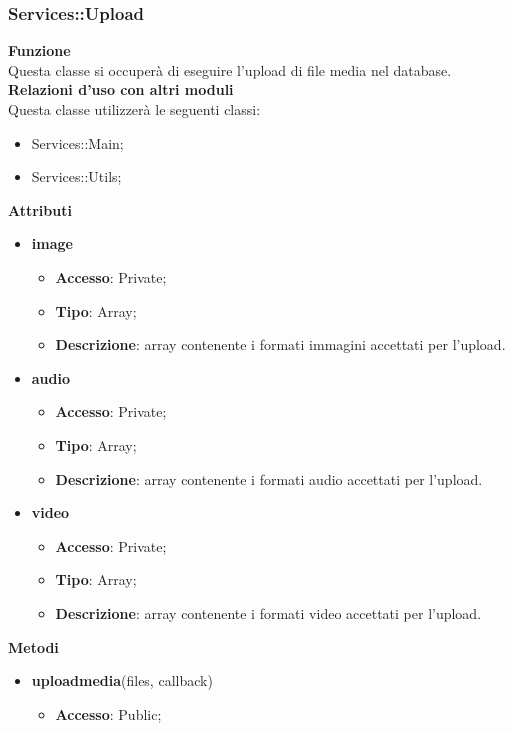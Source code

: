 \subsubsection{Services::Upload}{
		\label{sub:servicesUpload}
		\textbf{Funzione}\\
		\indent Questa classe si occuperà di eseguire l'upload di file media nel database.\\
		\textbf{Relazioni d'uso con altri moduli}\\
		\indent Questa classe utilizzerà le seguenti classi:
		\begin{itemize}
			\item Services::Main;
			\item Services::Utils;
		\end{itemize}
		\textbf{Attributi}
		\begin{itemize}
			\item \textbf{image}
			\begin{itemize}
				\item \textbf{Accesso}: Private;
				\item \textbf{Tipo}: Array;
				\item \textbf{Descrizione}: array contenente i formati immagini accettati per l'upload.
			\end{itemize}
			\item \textbf{audio}
			\begin{itemize}
				\item \textbf{Accesso}: Private;
				\item \textbf{Tipo}: Array;
				\item \textbf{Descrizione}: array contenente i formati audio accettati per l'upload.
			\end{itemize}
			\item \textbf{video}
			\begin{itemize}
				\item \textbf{Accesso}: Private;
				\item \textbf{Tipo}: Array;
				\item \textbf{Descrizione}: array contenente i formati video accettati per l'upload.
			\end{itemize}
		\end{itemize}
		\textbf{Metodi}
		\begin{itemize}
			\item \textbf{uploadmedia}(files, callback)
			\begin{itemize}
				\item \textbf{Accesso}: Public;

\end{itemize}
\end{itemize}}
